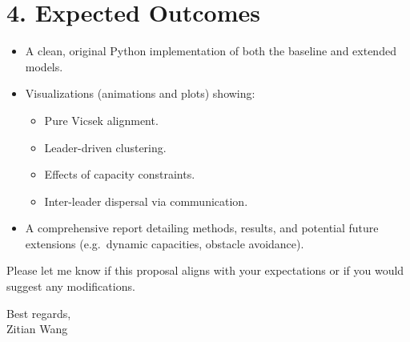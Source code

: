 \documentclass[11pt]{article}
\begin{document}
\section*{4. Expected Outcomes}
\begin{itemize}
  \item A clean, original Python implementation of both the baseline and extended models.
  \item Visualizations (animations and plots) showing:
    \begin{itemize}
      \item Pure Vicsek alignment.
      \item Leader-driven clustering.
      \item Effects of capacity constraints.
      \item Inter-leader dispersal via communication.
    \end{itemize}
  \item A comprehensive report detailing methods, results, and potential future extensions (e.g.\ dynamic capacities, obstacle avoidance).
\end{itemize}

\bigskip
\noindent Please let me know if this proposal aligns with your expectations or if you would suggest any modifications.

\bigskip
\noindent Best regards,\\
Zitian Wang
\end{document}
